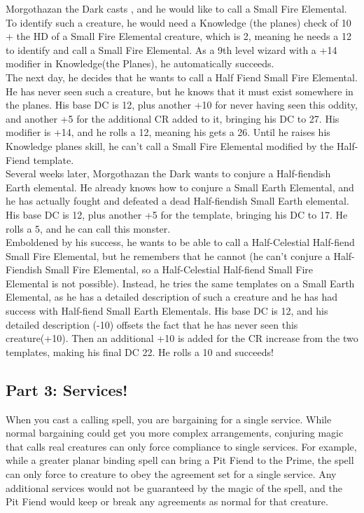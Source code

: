       Morgothazan the Dark casts , and he would like to call a Small Fire Elemental. To identify such a creature, he would need a Knowledge (the planes) check of 10 + the HD of a Small Fire Elemental creature, which is 2, meaning he needs a 12 to identify and call a Small Fire Elemental. As a 9th level wizard with a +14 modifier in Knowledge(the Planes), he automatically succeeds.\\
      The next day, he decides that he wants to call a Half Fiend Small Fire Elemental. He has never seen such a creature, but he knows that it must exist somewhere in the planes. His base DC is 12, plus another +10 for never having seen this oddity, and another +5 for the additional CR added to it, bringing his DC to 27. His modifier is +14, and he rolls a 12, meaning his gets a 26. Until he raises his Knowledge planes skill, he can't call a Small Fire Elemental modified by the Half-Fiend template.\\
      Several weeks later, Morgothazan the Dark wants to conjure a Half-fiendish Earth elemental. He already knows how to conjure a Small Earth Elemental, and he has actually fought and defeated a dead Half-fiendish Small Earth elemental. His base DC is 12, plus another +5 for the template, bringing his DC to 17. He rolls a 5, and he can call this monster.\\
      Emboldened by his success, he wants to be able to call a Half-Celestial Half-fiend Small Fire Elemental, but he remembers that he cannot (he can't conjure a Half-Fiendish Small Fire Elemental, so a Half-Celestial Half-fiend Small Fire Elemental is not possible). Instead, he tries the same templates on a Small Earth Elemental, as he has a detailed description of such a creature and he has had success with Half-fiend Small Earth Elementals. His base DC is 12, and his detailed description (-10) offsets the fact that he has never seen this creature(+10). Then an additional +10 is added for the CR increase from the two templates, making his final DC 22. He rolls a 10 and succeeds!

\subsection{Part 3: Services!}
When you cast a calling spell, you are bargaining for a single service. While normal bargaining could get you more complex arrangements, conjuring magic that calls real creatures can only force compliance to single services. For example, while a greater planar binding spell can bring a Pit Fiend to the Prime, the spell can only force to creature to obey the agreement set for a single service. Any additional services would not be guaranteed by the magic of the spell, and the Pit Fiend would keep or break any agreements as normal for that creature.

